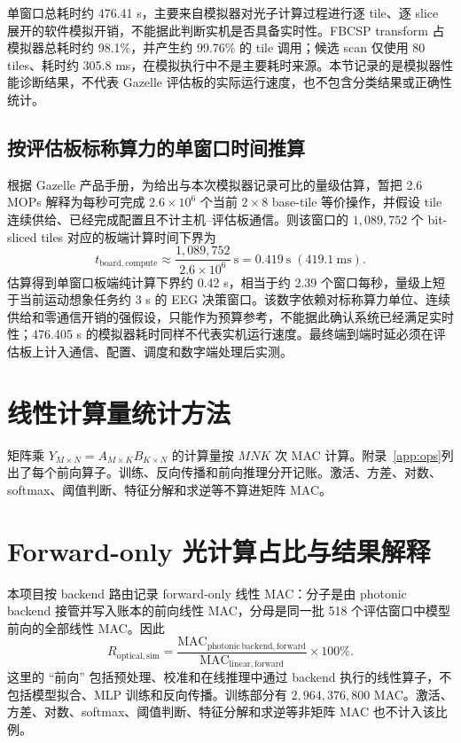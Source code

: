 \documentclass[
    TwoSide=false,
    Degree=graduate,
    GradLevel=master,
    Type=thesis,
    Title={光电混合运动想象脑机接口技术文档}
]{zjuthesis}
\begin{document}
单窗口总耗时约 476.41 s，主要来自模拟器对光子计算过程进行逐 tile、逐 slice 展开的软件模拟开销，不能据此判断实机是否具备实时性。FBCSP transform 占模拟器总耗时约 98.1\%，并产生约 99.76\% 的 tile 调用；候选 scan 仅使用 80 tiles、耗时约 305.8 ms，在模拟执行中不是主要耗时来源。本节记录的是模拟器性能诊断结果，不代表 Gazelle 评估板的实际运行速度，也不包含分类结果或正确性统计。

\subsection{按评估板标称算力的单窗口时间推算}
根据 Gazelle 产品手册\cite{gazellemanual}，为给出与本次模拟器记录可比的量级估算，暂把 2.6 MOPs 解释为每秒可完成 $2.6\times10^6$ 个当前 $2\times8$ base-tile 等价操作，并假设 tile 连续供给、已经完成配置且不计主机--评估板通信。则该窗口的 $1{,}089{,}752$ 个 bit-sliced tiles 对应的板端计算时间下界为
\begin{equation}
t_{\mathrm{board,compute}}\approx\frac{1{,}089{,}752}{2.6\times10^6}\ \mathrm{s}=0.419\ \mathrm{s}\;(419.1\ \mathrm{ms}).
\end{equation}
估算得到单窗口板端纯计算下界约 0.42 s，相当于约 2.39 个窗口每秒，量级上短于当前运动想象任务约 3 s 的 EEG 决策窗口。该数字依赖对标称算力单位、连续供给和零通信开销的强假设，只能作为预算参考，不能据此确认系统已经满足实时性；476.405 s 的模拟器耗时同样不代表实机运行速度。最终端到端时延必须在评估板上计入通信、配置、调度和数字端处理后实测。

\section{线性计算量统计方法}
矩阵乘 $Y_{M\times N}=A_{M\times K}B_{K\times N}$ 的计算量按 $MNK$ 次 MAC 计算。附录~\ref{app:ops}列出了每个前向算子。训练、反向传播和前向推理分开记账。激活、方差、对数、softmax、阈值判断、特征分解和求逆等不算进矩阵 MAC。

\section{Forward-only 光计算占比与结果解释}
本项目按 backend 路由记录 forward-only 线性 MAC：分子是由 photonic backend 接管并写入账本的前向线性 MAC，分母是同一批 518 个评估窗口中模型前向的全部线性 MAC。因此
\begin{equation}\label{eq:photonic_share}
R_{\mathrm{optical,sim}}=
\frac{\mathrm{MAC}_{\mathrm{photonic\,backend,forward}}}
     {\mathrm{MAC}_{\mathrm{linear,forward}}}\times100\%.
\end{equation}
这里的 ``前向'' 包括预处理、校准和在线推理中通过 backend 执行的线性算子，不包括模型拟合、MLP 训练和反向传播。训练部分有 $2{,}964{,}376{,}800$ MAC。激活、方差、对数、softmax、阈值判断、特征分解和求逆等非矩阵 MAC 也不计入该比例。
\end{document}
